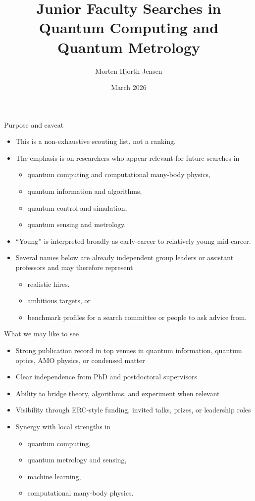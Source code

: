 \documentclass{beamer}
\title{Junior Faculty Searches in Quantum Computing and Quantum Metrology}
\author{Morten Hjorth-Jensen}
\date{March 2026}
\begin{document}
\frame{\titlepage}

\begin{frame}{Purpose and caveat}
\begin{itemize}
\item This is a non-exhaustive scouting list, not a ranking.
\item The emphasis is on researchers who appear relevant for future searches in
\begin{itemize}
\item quantum computing and computational many-body physics,
\item quantum information and algorithms,
\item quantum control and simulation,
\item quantum sensing and metrology.
\end{itemize}
\item ``Young'' is interpreted broadly as early-career to relatively young mid-career.
\item Several names below are already independent group leaders or assistant professors and may therefore represent
\begin{itemize}
\item realistic hires,
\item ambitious targets, or
\item benchmark profiles for a search committee or people to ask advice from.
\end{itemize}
\end{itemize}
\end{frame}

\begin{frame}{What we may like to see}
\begin{itemize}
\item Strong publication record in top venues in quantum information, quantum optics, AMO physics, or condensed matter
\item Clear independence from PhD and postdoctoral supervisors
\item Ability to bridge theory, algorithms, and experiment when relevant
\item Visibility through ERC-style funding, invited talks, prizes, or leadership roles
\item Synergy with local strengths in
\begin{itemize}
\item quantum computing,
\item quantum metrology and sensing,
\item machine learning,
\item computational many-body physics.
\end{itemize}
\end{itemize}
\end{frame}
\end{document}
